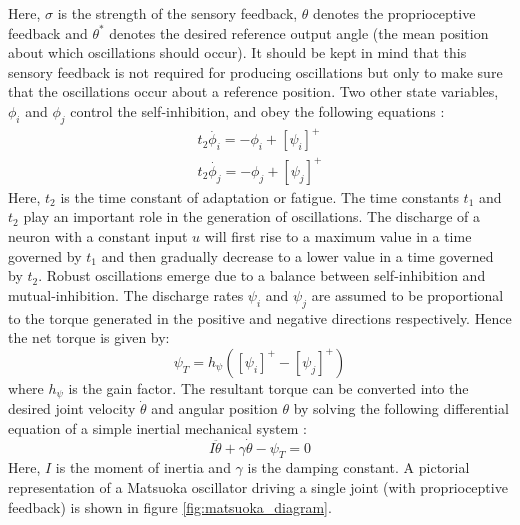\documentclass[12pt,twoside]{article}
\theoremstyle{plain}
\theoremstyle{definition}
\theoremstyle{remark}
\begin{document}
Here, $\sigma$ is the strength of the sensory feedback, $\theta$ denotes the proprioceptive feedback and $\theta^{*}$ denotes the desired reference output angle (the mean position about which oscillations should occur). It should be kept in mind that this sensory feedback is not required for producing oscillations but only to make sure that the oscillations occur about a reference position. Two other state variables, $\phi_i$ and $\phi_j$ control the self-inhibition, and obey the following equations \cite{Ronsse2009}: 
\begin{subequations} 
\label{eq:matsuoka_phi}
\begin{align}
 t_2 \dot{\phi_i}=-\phi_i + [\psi_i]^+\\
 t_2 \dot{\phi_j}=-\phi_j + [\psi_j]^+
 \end{align}
\end{subequations}
Here, $t_2$ is the time constant of adaptation or fatigue. The time constants $t_1$ and $t_2$ play an important role in the generation of oscillations. The discharge of a neuron with a constant input $u$ will first rise to a maximum value in a time governed by $t_1$ and then gradually decrease to a lower value in a time governed by $t_2$. Robust oscillations emerge due to a balance between self-inhibition and mutual-inhibition. The discharge rates $\psi_i$ and $\psi_j$ are assumed to be proportional to the torque generated in the positive and negative directions respectively. Hence the net torque is given by: 
\begin{equation}
\label{eq:matsuoka_net_torque}
\psi_T=h_{\psi}([\psi_i]^+ - [\psi_j]^+)
\end{equation}
where $h_{\psi}$ is the gain factor. The resultant torque can be converted into the desired joint velocity $\dot{\theta}$ and angular position $\theta$ by solving the following differential equation of a simple inertial mechanical system \cite{Ronsse2009}:
\begin{equation}
I\ddot{\theta} + \gamma \dot{\theta} - \psi_T = 0
\end{equation}
Here, $I$ is the moment of inertia and $\gamma$ is the damping constant. A pictorial representation of a Matsuoka oscillator driving a single joint (with proprioceptive feedback) is shown in figure \ref{fig:matsuoka_diagram}.
\end{document}
